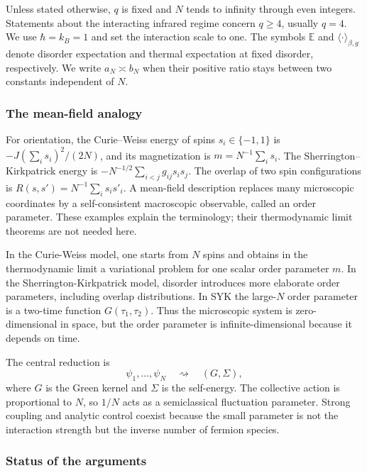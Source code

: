\documentclass[11pt]{article}
\numberwithin{equation}{section}
\theoremstyle{exposition}
\theoremstyle{result}
\newcommand{\E}{\mathbb E}
\begin{document}
Unless stated otherwise, $q$ is fixed and $N$ tends to infinity through even integers. Statements about the interacting infrared regime concern $q\geq4$, usually $q=4$. We use $\hbar=k_B=1$ and set the interaction scale to one. The symbols $\E$ and $\langle\cdot\rangle_{\beta,g}$ denote disorder expectation and thermal expectation at fixed disorder, respectively. We write $a_N\asymp b_N$ when their positive ratio stays between two constants independent of $N$.

\subsubsection{The mean-field analogy}


For orientation, the Curie--Weiss energy of spins $s_i\in\{-1,1\}$ is $-J(\sum_i s_i)^2/(2N)$, and its magnetization is $m=N^{-1}\sum_i s_i$. The Sherrington--Kirkpatrick energy is $-N^{-1/2}\sum_{i<j}g_{ij}s_is_j$. The overlap of two spin configurations is $R(s,s')=N^{-1}\sum_i s_is'_i$. A mean-field description replaces many microscopic coordinates by a self-consistent macroscopic observable, called an order parameter. These examples explain the terminology; their thermodynamic limit theorems are not needed here.

In the Curie-Weiss model, one starts from $N$ spins and obtains in the thermodynamic limit a variational problem for one scalar order parameter $m$. In the Sherrington-Kirkpatrick model, disorder introduces more elaborate order parameters, including overlap distributions. In SYK the large-$N$ order parameter is a two-time function $G(\tau_1,\tau_2)$. Thus the microscopic system is zero-dimensional in space, but the order parameter is infinite-dimensional because it depends on time.

The central reduction is
\begin{equation*}
\psi_1,\ldots,\psi_N
\quad\rightsquigarrow\quad
(G,\Sigma),
\end{equation*}
where $G$ is the Green kernel and $\Sigma$ is the self-energy. The collective action is proportional to $N$, so $1/N$ acts as a semiclassical fluctuation parameter. Strong coupling and analytic control coexist because the small parameter is not the interaction strength but the inverse number of fermion species.

\subsubsection{Status of the arguments}
\end{document}
